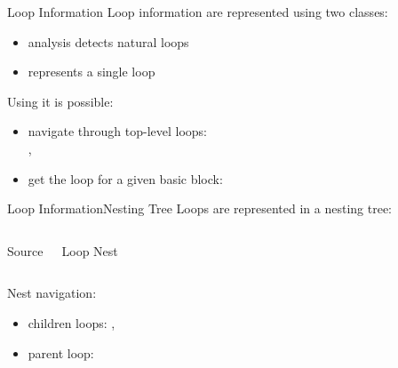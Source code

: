\begin{frame}{Loop Information}
Loop information are represented using two classes:

\begin{itemize}
\item {} analysis detects natural loops
\item {} represents a single loop
\end{itemize}

\vfill
Using  it is possible:

\begin{itemize}
\item navigate through top-level loops: \\
      , 
\item get the loop for a given basic block: \\
\end{itemize}
\end{frame}


\begin{frame}{Loop Information}{Nesting Tree}
Loops are represented in a \alert{nesting tree}:

\begin{columns}[t]
\begin{block}{Source}
\centering
{}
\end{block}

\begin{block}{Loop Nest}
\centering

\end{block}
\end{columns}

Nest navigation:

\begin{itemize}
\item children loops: ,
\item parent loop: 
\end{itemize}
\end{frame}


